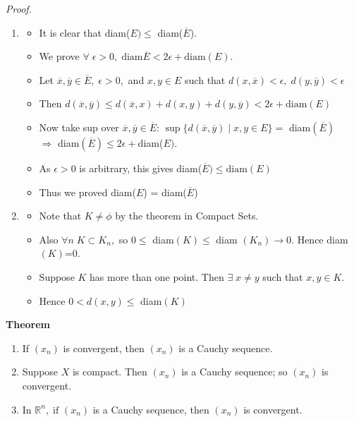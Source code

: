 \documentclass[12pt]{article}
\begin{document}
\newpage
{\sl Proof.}
\begin{enumerate}[label=(\roman*)]
    \item 
    \begin{itemize}
        \item It is clear that diam($E)\le$ diam($\overline{E}$).
        \item We prove $\forall\;\epsilon>0,\;\text{diam}\overline{E}<2\epsilon +\text{diam}(E)$.
        \item Let $\overline{x},\overline{y}\in \overline{E},\; \epsilon>0,$ and $x,y\in E$ such that $d(x,\overline{x})<\epsilon,\;d(y,\overline{y})<\epsilon$
        \item Then $d(\overline{x},\overline{y})\le d(\overline{x},x) + d(x,y)+d(y,\overline{y}) < 2\epsilon + \text{diam}(E)$
        \item Now take sup over $\overline{x},\overline{y}\in \overline{E}$: $ \sup\{d(\overline{x},\overline{y})\;|\; x,y\in E\}= $ diam$(\overline{E})$ 
        \\ $\Rightarrow$ diam$(\overline{E})\le 2\epsilon +$diam($E)$.
        \item As $\epsilon>0$ is arbitrary, this gives diam($\overline{E})\le \text{diam}(E)$
        \item Thus we proved diam($E$) = diam($\overline{E}$)\\
    \end{itemize}
    
    \item
    \begin{itemize}
        \item Note that $K\neq \phi$ by the theorem in Compact Sets.
        \item Also $\forall n\; K\subset K_n,$ so $0\le$ diam$(K)\le$ diam $(K_n) \to 0$. Hence diam$(K)$=0.
        \item Suppose $K$ has more than one point. Then $\exists\; x\neq y$ such that $x,y\in K$. 
        \item Hence $0<d(x,y)\le$ diam$(K)$\\
    \end{itemize}
\end{enumerate}

{\bf Theorem}
\begin{enumerate}[label=(\roman*)]
    \item If $(x_n)$ is convergent, then $(x_n)$ is a Cauchy sequence.
    \item Suppose $X$ is compact. Then $(x_n)$ is a Cauchy sequence; so $(x_n)$ is convergent.
    \item In $\mathbb{R}^n,\;\text{if }(x_n)$ is a Cauchy sequence, then $(x_n)$ is convergent.\\
\end{enumerate}
\end{document}
